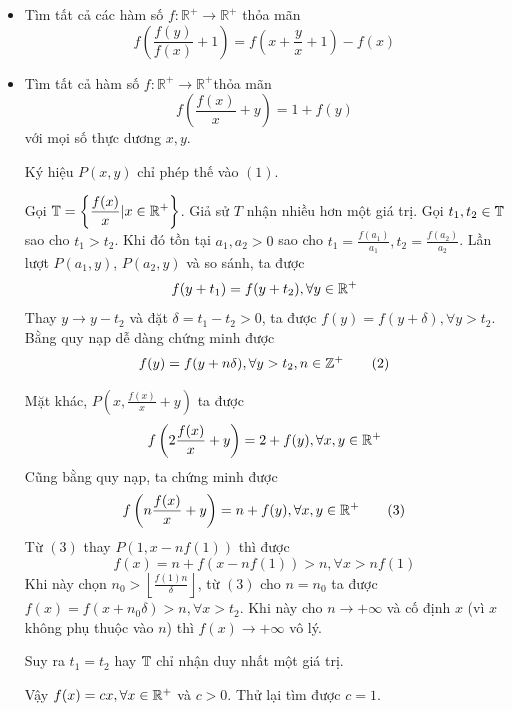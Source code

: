 \documentclass[11pt]{scrartcl}
\begin{document}
\begin{itemize}[label=, leftmargin=0em, itemsep=0.5em]
    
    
        \item \begin{bt}
            Tìm tất cả các hàm số $f: \mathbb{R}^+\rightarrow \mathbb{R}^+$ thỏa mãn
            \[f\left(\frac{f(y)}{f(x)}+1\right)=f\left(x+\frac{y}{x}+1\right)-f(x)\]
        \end{bt}
    
    
    \item \begin{bt}
        Tìm tất cả hàm số $f: \mathbb{R}^{+} \rightarrow \mathbb{R}^{+}$thỏa mãn
        \[
        f\left(\frac{f(x)}{x}+y\right)=1+f(y) \tag{1}
        \]
        với mọi số thực dương $x, y$.
    \end{bt}
    
    \begin{sol}
        Ký hiệu $P(x,y)$ chỉ phép thế vào $(1)$.


        Gọi $\bb{T} =\left\{\frac{f(x)}{x}| x \in \bb{R^+}\right\}$. Giả sử $T$ nhận nhiều hơn một giá trị. Gọi $t_1, t_2 \in \mathbb{T}$ sao cho $t_1 > t_2$. Khi đó tồn tại $a_1,a_2 > 0$ sao cho $t_1 = \frac{f(a_1)}{a_1}, t_2 = \frac{f(a_2)}{a_2}$. Lần lượt $P(a_1,y)$, $P(a_2,y)$ và so sánh, ta được 
        \[
            f(y + t_1) = f(y + t_2), \forall y\in \mathbb{R^+}
        \]
        Thay $y \to y - t_2$ và đặt $\delta = t_1 - t_2 > 0$, ta được $f(y) = f(y + \delta), \forall y > t_2$. Bằng quy nạp dễ dàng chứng minh được 
        \[f(y) = f(y + n\delta),\forall y > t_2, n \in \mathbb{Z^+} \tag{2}\]
        
        Mặt khác, $P(x, \frac{f(x)}{x} + y)$ ta được 
        \[
            f\left(2\frac{f(x)}{x}+y\right)=2+f(y), \xyro
        \]
        Cũng bằng quy nạp, ta chứng minh được 
        \[
            f\left(n\frac{f(x)}{x}+y\right)=n+f(y), \xyro \tag{3}
        \]
        Từ $(3)$ thay $P(1,x - nf(1))$ thì được 
        \[
            f(x) = n + f(x - nf(1)) > n ,\forall x > nf(1)
        \]
        Khi này chọn $n_0 > \left\lfloor \frac{f(1)n}{\delta}\right\rfloor$, từ $(3)$ cho $n = n_0$ ta được $f(x) = f(x + n_0\delta) > n, \forall x > t_2$. Khi này cho $n \to +\infty$ và cố định $x$ (vì $x$ không phụ thuộc vào $n$) thì $f(x) \to +\infty$ vô lý. 

        Suy ra $t_1 = t_2$ hay $\mathbb{T}$ chỉ nhận duy nhất một giá trị.

        Vậy $f(x) = cx, \forall x\in \mathbb{R^+}$ và $c > 0$. Thử lại tìm được $c = 1$. 


\end{sol}
\end{itemize}
\end{document}
